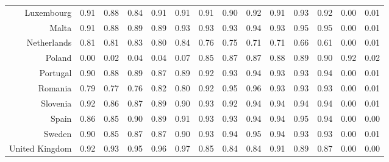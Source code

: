 \documentclass[a4paper,twoside,10pt]{article}
\begin{document}
\begin{table}[H]
\begin{tabular}{r|rrrrr|rrrrrr|rr}
			\hline 
			Luxembourg & 0.91 & 0.88 & 0.84 & 0.91 & 0.91 & 0.91 & 0.90 & 0.92 & 0.91 & 0.93 & 0.92 & 0.00 & 0.01 \\ 
			Malta & 0.91 & 0.88 & 0.89 & 0.89 & 0.93 & 0.93 & 0.93 & 0.94 & 0.93 & 0.95 & 0.95 & 0.00 & 0.01 \\ 
			Netherlands & 0.81 & 0.81 & 0.83 & 0.80 & 0.84 & 0.76 & 0.75 & 0.71 & 0.71 & 0.66 & 0.61 & 0.00 & 0.01 \\ 
			\rowcolor{cyan} Poland & 0.00 & 0.02 & 0.04 & 0.04 & 0.07 & 0.85 & 0.87 & 0.87 & 0.88 & 0.89 & 0.90 & 0.92 & 0.02 \\ 
			Portugal & 0.90 & 0.88 & 0.89 & 0.87 & 0.89 & 0.92 & 0.93 & 0.94 & 0.93 & 0.93 & 0.94 & 0.00 & 0.01 \\
			\hline 
			Romania & 0.79 & 0.77 & 0.76 & 0.82 & 0.80 & 0.92 & 0.95 & 0.96 & 0.93 & 0.93 & 0.93 & 0.00 & 0.01 \\ 
			Slovenia & 0.92 & 0.86 & 0.87 & 0.89 & 0.90 & 0.93 & 0.92 & 0.94 & 0.94 & 0.94 & 0.94 & 0.00 & 0.01 \\ 
			Spain & 0.86 & 0.85 & 0.90 & 0.89 & 0.91 & 0.93 & 0.93 & 0.94 & 0.94 & 0.95 & 0.94 & 0.00 & 0.00 \\ 
			Sweden & 0.90 & 0.85 & 0.87 & 0.87 & 0.90 & 0.93 & 0.94 & 0.95 & 0.94 & 0.93 & 0.93 & 0.00 & 0.01 \\ 
			United Kingdom & 0.92 & 0.93 & 0.95 & 0.96 & 0.97 & 0.85 & 0.84 & 0.84 & 0.91 & 0.89 & 0.87 & 0.00 & 0.00 \\ 
			\hline
		\end{tabular}
	\end{table}
	
	
	
	
\end{document}
